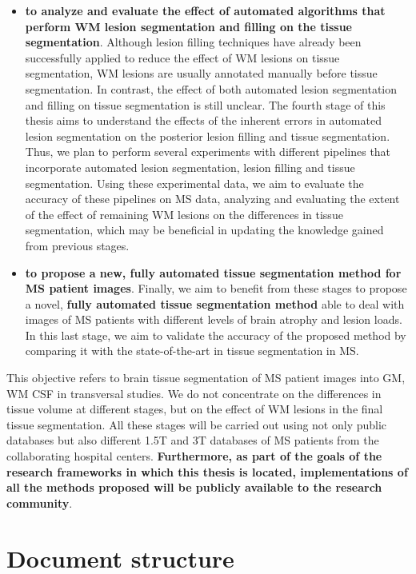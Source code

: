 \begin{itemize}
\item \textbf{to analyze and evaluate the effect of automated algorithms that perform WM lesion segmentation and filling on the tissue segmentation}. Although lesion filling techniques have already been successfully applied to reduce the effect of WM lesions on tissue segmentation, WM lesions are usually annotated manually before tissue segmentation. In contrast, the effect of both automated lesion segmentation and filling on tissue segmentation is still unclear. The fourth stage of this thesis aims to understand the effects of the inherent errors in automated lesion segmentation on the posterior lesion filling and tissue segmentation. Thus, we plan to perform several experiments with different pipelines that incorporate automated lesion segmentation, lesion filling and tissue segmentation. Using these experimental data, we aim to evaluate the accuracy of these pipelines on MS data, analyzing and evaluating the extent of the effect of remaining WM lesions on the differences in tissue segmentation, which may be beneficial in updating the knowledge gained from previous stages. 

\item \textbf{to propose a new, fully automated tissue segmentation method for MS patient images}. Finally, we aim to benefit from these stages to propose a novel, \textbf{fully automated tissue segmentation method} able to deal with images of MS patients with different levels of brain atrophy and lesion loads. In this last stage, we aim to validate the accuracy of the proposed method by comparing it with the state-of-the-art in tissue segmentation in MS. 

\end{itemize}

\noindent This objective refers to brain tissue segmentation of MS patient images into GM, WM CSF in transversal studies. We do not concentrate on the differences in tissue volume at different stages, but on the effect of WM lesions in the final tissue segmentation. All these stages will be carried out using not only public databases but also different 1.5T and 3T databases of MS patients from the collaborating hospital centers. \textbf{Furthermore, as part of the goals of the research frameworks in which this thesis is located, implementations of all the methods proposed will be publicly available to the research community}.

\section{Document structure}
\label{sec:label}

